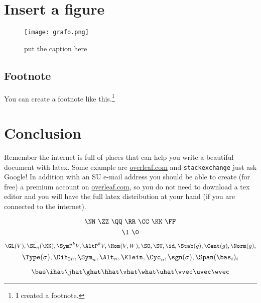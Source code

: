 \clearpage{\thispagestyle{empty}\cleardoublepage}

\section{Insert a figure}
\begin{figure}[H]
	\centering
	\texttt{[image: grafo.png]}
	\caption{\label{fig:1} put the caption here}
\end{figure}

\subsection{Footnote}

You can create a footnote like this.\footnote{I created a footnote.}



\clearpage{\thispagestyle{empty}\cleardoublepage}
\section{Conclusion}

Remember the internet is full of places that can help you write a beautiful document with latex.
Some example are \url{overleaf.com} and \verb!stackexchange! just ask Google! 
In addition with an SU e-mail address you should be able to 
create (for free) a premium account on \url{overleaf.com}, 
so you do not need to download a tex editor and you will have
the full latex distribution at your hand (if you are connected to the internet).


$$ \NN \ \ZZ \ \QQ \ \RR \ \CC \ \KK \ \FF$$
$$ \1 \ \0 $$

$$ \GL(V),  \SL_n(\KK), \SymP^k V, \AltP^k V, \Hom(V,W), \SO, \SU, \id, \Stab(g), \Cent(g), \Norm(g),$$ $$ \Type(\sigma), \Dih_{2n}, \Sym_n, \Alt_n, \Klein, \Cyc_n, \sgn(\sigma), \Span(\bas_i)_i $$

$$ \bas \ihat \jhat \ghat \hhat \vhat \what \uhat \vvec \uvec \wvec $$